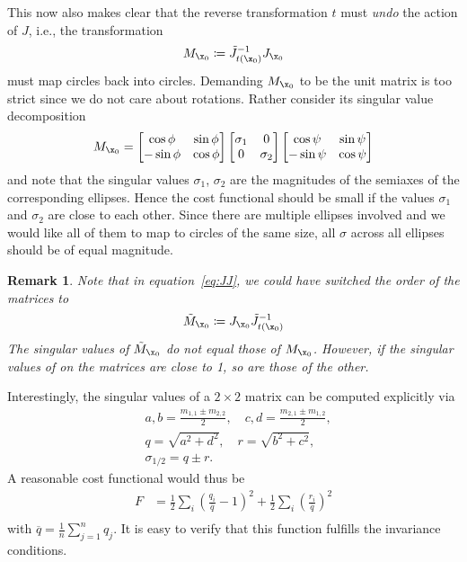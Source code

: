 \documentclass{scrartcl}
\newtheorem*{remark}{Remark}
\theoremstyle{named}
\begin{document}
This now also makes clear that the reverse transformation $t$ must \emph{undo} the
action of $J$, i.e., the transformation
\begin{equation}\label{eq:JJ}
  M_{\x_0} \coloneqq \tilde{J}_{t(\x_0)}^{-1} J_{\x_0}
\end{equation}
must map circles back into circles.
Demanding $M_{\x_0}$ to be the unit matrix is too
strict since we do not care about rotations. Rather consider its singular value
decomposition
\[
  M_{\x_0} =
  \begin{bmatrix}
    \cos \phi & \sin\phi\\
    -\sin \phi & \cos\phi
  \end{bmatrix}
  \begin{bmatrix}
    \sigma_1 & 0\\
    0 & \sigma_2
  \end{bmatrix}
  \begin{bmatrix}
    \cos \psi & \sin\psi\\
    -\sin \psi & \cos\psi
  \end{bmatrix}
\]
and note that the singular values $\sigma_1$, $\sigma_2$ are the magnitudes of the
semiaxes of the corresponding ellipses. Hence the cost functional should be small
if the values $\sigma_1$ and $\sigma_2$ are close to each other. Since there are
multiple ellipses involved and we would like all of them to map to circles of the same
size, all $\sigma$ across all ellipses should be of equal magnitude.

\begin{remark}
  Note that in equation~\ref{eq:JJ}, we could have switched the order of the matrices to
  \[
  \tilde{M}_{\x_0} \coloneqq J_{\x_0} \tilde{J}_{t(\x_0)}^{-1}
  \]
  The singular values of $\tilde{M}_{\x_0}$ do not equal those of $M_{\x_0}$.
  However, if the singular values of on the matrices are close to 1, so are those of the
  other.

\end{remark}

Interestingly, the singular values of a $2\times 2$ matrix can be computed explicitly
via
\[
  \begin{split}
    &a,b = \frac{m_{1, 1} \pm m_{2, 2}}{2},\quad c,d = \frac{m_{2, 1} \pm m_{1, 2}}{2},\\
    &q = \sqrt{a^2 + d^2},\quad r = \sqrt{b^2 + c^2},\\
    &\sigma_{1/2} = q \pm r.
  \end{split}
\]
A reasonable cost functional would thus be
\[
  \begin{split}
  F &=
  \frac{1}{2} \sum_i {\left(\frac{q_i}{\overline{q}} - 1\right)}^2
  + \frac{1}{2} \sum_i {\left(\frac{r_i}{\overline{q}}\right)}^2\\
  \end{split}
\]
with $\overline{q} = \frac{1}{n} \sum_{j=1}^n q_j$. It is easy to verify that this
function fulfills the invariance conditions.
\end{document}
